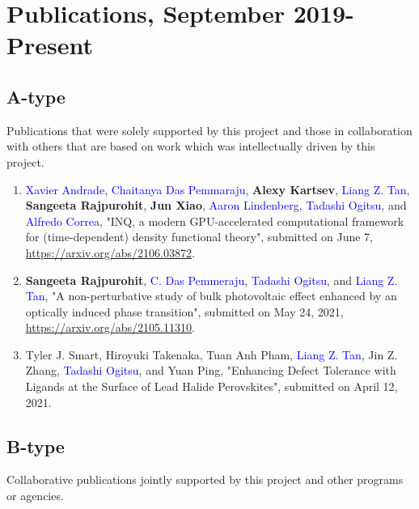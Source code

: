 \section{Publications, September 2019-Present}
\label{sec:publications}

\subsection{A-type}
Publications that were solely supported by this project and those in collaboration with others that are based on work which was intellectually driven by this project.
\begin{enumerate}
    \item \textcolor{blue}{Xavier Andrade}, \textcolor{blue}{Chaitanya Das Pemmaraju}, {\bf Alexy Kartsev}, \textcolor{blue}{Liang Z. Tan}, {\bf Sangeeta Rajpurohit}, {\bf Jun Xiao},  \textcolor{blue}{Aaron Lindenberg}, \textcolor{blue}{Tadashi Ogitsu}, and \textcolor{blue}{Alfredo Correa}, "INQ, a modern GPU-accelerated computational framework for (time-dependent) density functional theory", submitted on June 7, \url{https://arxiv.org/abs/2106.03872}.
    \item {\bf Sangeeta Rajpurohit}, \textcolor{blue}{C. Das Pemmeraju}, \textcolor{blue}{Tadashi Ogitsu}, and \textcolor{blue}{Liang Z. Tan}, "A non-perturbative study of bulk photovoltaic effect enhanced by an optically induced phase transition", submitted on May 24, 2021, \url{https://arxiv.org/abs/2105.11310}.
    \item Tyler J. Smart, Hiroyuki Takenaka, Tuan Anh Pham, \textcolor{blue}{Liang Z. Tan}, Jin Z. Zhang, \textcolor{blue}{Tadashi Ogitsu}, and Yuan Ping, "Enhancing Defect Tolerance with Ligands at the Surface of Lead Halide Perovskites", submitted on April 12, 2021.
\end{enumerate}

\subsection{B-type}

Collaborative publications jointly supported by this project and other programs or agencies.


